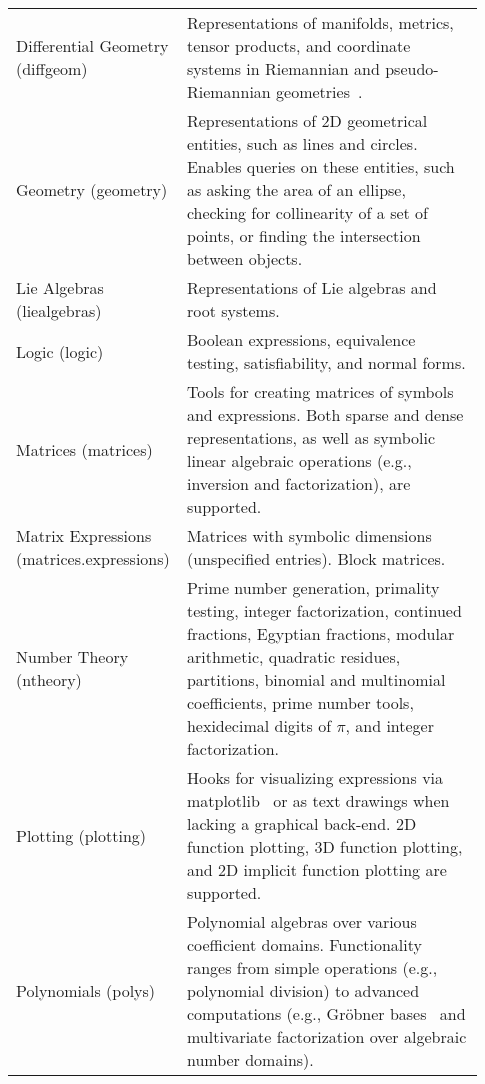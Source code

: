 \begin{longtable}[htbc]{p{0.30\linewidth}p{0.63\linewidth}}
Differential Geometry (diffgeom) & Representations of manifolds, metrics, tensor
products, and coordinate systems in Riemannian and pseudo-Riemannian
geometries~\cite{FunctionalDifferentialGeometry}.\\

Geometry (geometry) & Representations of 2D geometrical entities, such as lines and
circles. Enables queries on these entities, such as asking the area of an
ellipse, checking for collinearity of a set of
points, or finding the intersection between objects.\\

Lie Algebras (liealgebras) & Representations of Lie algebras and root systems.\\

Logic (logic) & Boolean expressions, equivalence testing, satisfiability, and normal
forms.\\

Matrices (matrices) & Tools for creating matrices of symbols and expressions.
Both sparse and dense representations, as well as symbolic linear
algebraic operations (e.g., inversion and factorization), are
supported.\\

Matrix Expressions (matrices.expressions) & Matrices with symbolic dimensions (unspecified entries).
Block matrices.\\

Number Theory (ntheory) & Prime number generation, primality testing, integer
factorization, continued fractions, Egyptian fractions, modular arithmetic,
quadratic residues, partitions, binomial and multinomial coefficients,
prime number tools, hexidecimal digits of $\pi$, and integer factorization. \\

Plotting (plotting) & Hooks for visualizing expressions via matplotlib~\cite{Hunter:2007}
or as text drawings when lacking a graphical back-end. 2D function plotting,
3D function
plotting, and 2D implicit function plotting are supported.\\

Polynomials (polys) & Polynomial algebras over various coefficient domains.
Functionality ranges from simple operations (e.g., polynomial division) to
advanced computations (e.g., Gr\"obner bases~\cite{adams1994introduction} and multivariate
factorization over algebraic number domains).\\


\end{longtable}
